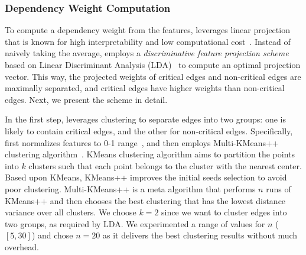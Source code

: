 %





\subsubsection{Dependency Weight Computation}
\label{subsubsec:weight-computation}


To compute a dependency weight from the features, \tool leverages linear projection that is known for high interpretability and low computational cost~\cite{friedman2001elements}.
Instead of naively taking the average,
\tool employs a \emph{discriminative feature projection scheme} based on Linear Discriminant Analysis (LDA)~\cite{Mika99fisherdiscriminant} to compute an optimal projection vector.
This way, the projected weights of critical edges and non-critical edges are maximally separated, and critical edges 
have higher weights than non-critical edges.
%
Next, we present the scheme in detail.



In the first step, \tool leverages clustering to separate edges into two groups: one is likely to contain critical edges, and the other for non-critical edges.
%
%
Specifically, \tool first normalizes features to 0-1 range~\cite{friedman2001elements}, and then employs Multi-KMeans++ clustering algorithm~\cite{Arthur:2007:KAC:1283383.1283494}.
KMeans clustering algorithm aims to partition the points into $k$ clusters such that each point belongs to the cluster with the nearest center.
Based upon KMeans, KMeans++ improves the initial seeds selection to avoid poor clustering.
Multi-KMeans++ is a meta algorithm that performs $n$ runs of KMeans++ and then chooses the best clustering that has the lowest distance variance over all clusters.
We choose $k=2$ since we want to cluster edges into two groups, as required by LDA.
We experimented a range of values for $n$ ($[5, 30]$) and chose $n=20$ as it delivers the best clustering results without much overhead.




